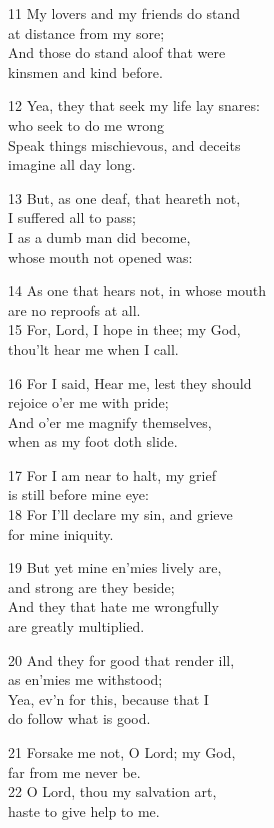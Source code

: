 11 My lovers and my friends do stand\\
at distance from my sore;\\
And those do stand aloof that were\\
kinsmen and kind before.

12 Yea, they that seek my life lay snares:\\
who seek to do me wrong\\
Speak things mischievous, and deceits\\
imagine all day long.

13 But, as one deaf, that heareth not,\\
I suffered all to pass;\\
I as a dumb man did become,\\
whose mouth not opened was:

14 As one that hears not, in whose mouth\\
are no reproofs at all.\\
15 For, Lord, I hope in thee; my God,\\
thou’lt hear me when I call.

16 For I said, Hear me, lest they should\\
rejoice o’er me with pride;\\
And o’er me magnify themselves,\\
when as my foot doth slide.

17 For I am near to halt, my grief\\
is still before mine eye:\\
18 For I’ll declare my sin, and grieve\\
for mine iniquity.

19 But yet mine en’mies lively are,\\
and strong are they beside;\\
And they that hate me wrongfully\\
are greatly multiplied.

20 And they for good that render ill,\\
as en’mies me withstood;\\
Yea, ev’n for this, because that I\\
do follow what is good.

21 Forsake me not, O Lord; my God,\\
far from me never be.\\
22 O Lord, thou my salvation art,\\
haste to give help to me.

